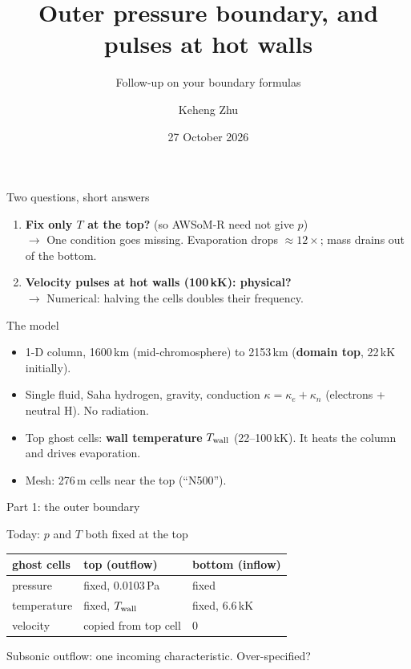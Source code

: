 \documentclass[aspectratio=169,11pt]{beamer}
\title{Outer pressure boundary, and pulses at hot walls}
\subtitle{Follow-up on your boundary formulas}
\author{Keheng Zhu}
\date{27 October 2026}
\begin{document}
\begin{frame}
  \titlepage
\end{frame}

\begin{frame}{Two questions, short answers}
  \begin{enumerate}
    \item \textbf{Fix only $T$ at the top?} (so AWSoM-R need not give $p$)\\[0.2em]
          $\to$ One condition goes missing. Evaporation drops $\approx12\times$;
          mass drains out of the bottom.
    \vspace{0.8em}
    \item \textbf{Velocity pulses at hot walls (100\,kK): physical?}\\[0.2em]
          $\to$ Numerical: halving the cells doubles their frequency.
  \end{enumerate}
\end{frame}

\begin{frame}{The model}
  \begin{itemize}
    \item 1-D column, 1600\,km (mid-chromosphere) to 2153\,km (\textbf{domain top},
          22\,kK initially).
    \item Single fluid, Saha hydrogen, gravity, conduction
          $\kappa = \kappa_e + \kappa_n$ (electrons + neutral H). No radiation.
    \item Top ghost cells: \textbf{wall temperature} $T_{\rm wall}$ (22--100\,kK).
          It heats the column and drives evaporation.
    \item Mesh: 276\,m cells near the top (``N500'').
  \end{itemize}
\end{frame}

\begin{frame}
  \centering\Large Part 1: the outer boundary
\end{frame}

\begin{frame}{Today: $p$ and $T$ both fixed at the top}
  \centering
  \begin{tabular}{@{}l l l@{}}
    \toprule
    ghost cells & top (outflow) & bottom (inflow) \\
    \midrule
    pressure    & fixed, 0.0103\,Pa & fixed \\
    temperature & fixed, $T_{\rm wall}$ & fixed, 6.6\,kK \\
    velocity    & copied from top cell & 0 \\
    \bottomrule
  \end{tabular}
  \vspace{1.2em}

  Subsonic outflow: one incoming characteristic. Over-specified?
\end{frame}
\end{document}
